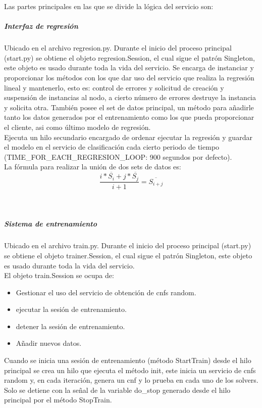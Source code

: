 \documentclass[11pt]{article}
\begin{document}
				Las partes principales en las que se divide la lógica del servicio son:
				\subparagraph{Interfaz de regresión}
					Ubicado en el archivo regresion.py. 
					Durante el inicio del proceso principal (start.py) se obtiene el objeto regresion.Session, el cual sigue el patrón Singleton, este objeto es usado durante toda la vida del servicio.
					Se encarga de instanciar y proporcionar los métodos con los que dar uso del servicio que realiza la regresión lineal y mantenerlo, esto es: control de errores y solicitud de creación
					y suspensión de instancias al nodo, a cierto número de errores destruye la instancia y solicita otra. También posee el set de datos principal, un método para añadirle tanto los
					datos generados por el entrenamiento como los que pueda proporcionar el cliente, asi como último modelo de regresión. \\
					Ejecuta un hilo secundario encargado de ordenar ejecutar la regresión y guardar el modelo en el servicio de clasificación cada cierto periodo de tiempo 
					(TIME\_FOR\_EACH\_REGRESION\_LOOP: 900 segundos por defecto). \\
					La fórmula para realizar la unión de dos sets de datos es: \\
					\begin{equation}
						\frac{i*\overline{S_i} + j*\overline{S_j}} {i+1} = \overline{S_{i+j}}
					\end{equation} \\ \\

				\subparagraph{Sistema de entrenamiento}
					Ubicado en el archivo train.py. Durante el inicio del proceso principal (start.py) se obtiene el objeto trainer.Session, el cual sigue el patrón Singleton, este objeto es usado durante toda la vida del servicio. \\
					El objeto train.Session se ocupa de:
					\begin{itemize}
						\item Gestionar el uso del servicio de obtención de cnfs random.
						\item ejecutar la sesión de entrenamiento.
						\item detener la sesión de entrenamiento.
						\item Añadir nuevos datos.
					\end{itemize} 

					Cuando se inicia una sesión de entrenamiento (método StartTrain) desde el hilo principal se crea un hilo que ejecuta el método init, este inicia un servicio de cnfs random y, en cada iteración, genera un cnf y lo prueba
					en cada uno de los solvers. Solo se detiene con la señal de la variable do\_stop generado desde el hilo principal por el método StopTrain.
					
\end{document}
